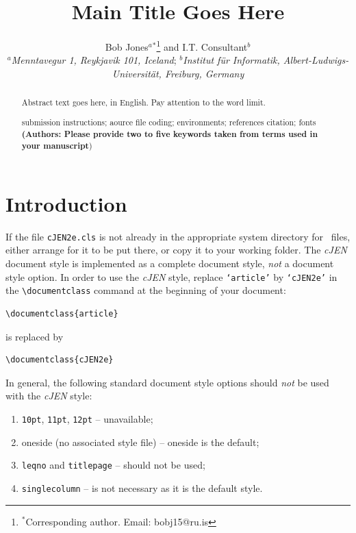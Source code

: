 \documentclass[]{cJEN2e}
\begin{document}
  




\title{Main Title Goes Here}

\author{Bob Jones$^{a}$$^{\ast}$\thanks{$^\ast$Corresponding author. Email: bobj15@ru.is
\vspace{6pt}} and I.T. Consultant$^{b}$\\
\vspace{6pt}  $^{a}${\em{Menntavegur 1, Reykjavik 101, Iceland}};
$^{b}${\em{Institut f\"{u}r Informatik, Albert-Ludwigs-Universit\"{a}t, Freiburg,
Germany}}}

\maketitle

\begin{abstract}
Abstract text goes here, in English.  Pay attention to the word limit.

\begin{keywords}submission instructions; aource file coding;
environments; references citation; fonts {\bf{(Authors: Please provide two to five keywords taken
from terms used in your manuscript}})
\end{keywords}\bigskip
\end{abstract}

\newpage

\section{Introduction}

If the file {\tt cJEN2e.cls} is not already in the appropriate system directory for \LaTeXe\ files, either
arrange for it to be put there, or copy it to your working folder. The {\it cJEN} document style is implemented
as a complete document style, {\em not\/} a document style option. In order to use the {\it cJEN} style, replace
{\tt `article'} by {\tt `cJEN2e'} in the \verb"\documentclass" command at the beginning of your document:
%
\begin{verbatim}
\documentclass{article}
\end{verbatim}
%
is replaced by
%
\begin{verbatim}
\documentclass{cJEN2e}
\end{verbatim}
%
In general, the following standard document style options should {\em not\/} be used with the {\it cJEN} style:
%
\begin{enumerate}
   \item {\tt 10pt}, {\tt 11pt}, {\tt 12pt} -- unavailable;
   \item oneside (no associated style file) -- oneside is the default;
   \item {\tt leqno} and {\tt titlepage} -- should not be used;
   \item {\tt singlecolumn} -- is not necessary as it is the default style.
\end{enumerate}
%
\end{document}
